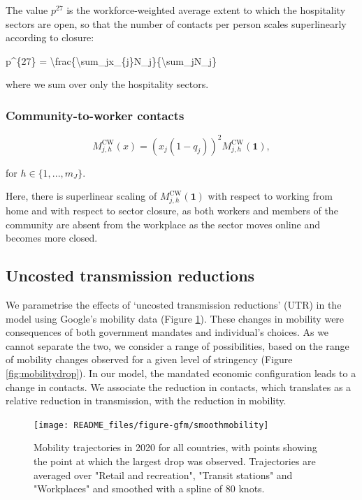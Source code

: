 \documentclass[
]{article}
\newenvironment{Shaded}{\begin{snugshade}}{\end{snugshade}}
\newcommand{\NormalTok}[1]{#1}
\begin{document}
The value \(p^{27}\) is the workforce-weighted average extent to which the hospitality sectors are open, so that the number of contacts per person scales superlinearly according to closure:

\begin{Shaded}
\begin{Highlighting}[]
\NormalTok{p\^{}\{27\} = \textbackslash{}frac\{\textbackslash{}sum\_jx\_\{j\}N\_j\}\{\textbackslash{}sum\_jN\_j\}}
\end{Highlighting}
\end{Shaded}

where we sum over only the hospitality sectors.

\subsubsection{Community-to-worker contacts}\label{community-to-worker-contacts}

\begin{equation}
M_{j,h}^{\text{CW}}(x) = (x_{j}(1-q_j))^2M_{j,h}^{\text{CW}}(\textbf{1}),
\label{eq:ctow}
\end{equation}

for \(h\in\{1,...,m_J\}\).

Here, there is superlinear scaling of \(M^{\text{CW}}_{j,h}(\textbf{1})\) with respect to working from home and with respect to sector closure, as both workers and members of the community are absent from the workplace as the sector moves online and becomes more closed.

\subsection{Uncosted transmission reductions}\label{uncosted-transmission-reductions}

We parametrise the effects of `uncosted transmission reductions' (UTR) in the model using Google's mobility data (Figure \ref{fig:smoothmobility}). These changes in mobility were consequences of both government mandates and individual's choices. As we cannot separate the two, we consider a range of possibilities, based on the range of mobility changes observed for a given level of stringency (Figure \ref{fig:mobilitydrop}). In our model, the mandated economic configuration leads to a change in contacts. We associate the reduction in contacts, which translates as a relative reduction in transmission, with the reduction in mobility.

\begin{figure}
\texttt{[image: README\_files/figure-gfm/smoothmobility]} \caption{Mobility trajectories in 2020 for all countries, with points showing the point at which the largest drop was observed. Trajectories are averaged over "Retail and recreation", "Transit stations" and "Workplaces" and smoothed with a spline of 80 knots.}\label{fig:smoothmobility}
\end{figure}
\end{document}
